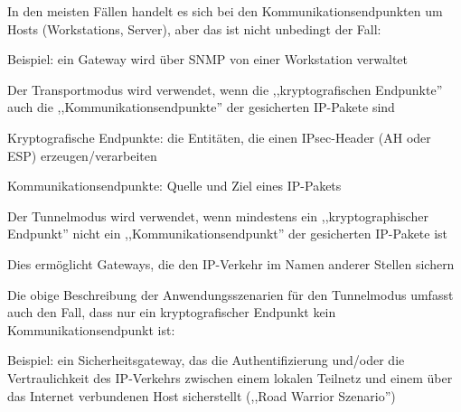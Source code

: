 \documentclass[a4paper]{article}
\begin{document}
\begin{multicols}{3}
      \begin{itemize*}
            \item In den meisten Fällen handelt es sich bei den Kommunikationsendpunkten
            um Hosts (Workstations, Server), aber das ist nicht unbedingt der
            Fall:
            \begin{itemize*}
                  \item Beispiel: ein Gateway wird über SNMP von einer Workstation verwaltet
            \end{itemize*}
            \item Der Transportmodus wird verwendet, wenn die ,,kryptografischen
            Endpunkte'' auch die ,,Kommunikationsendpunkte'' der gesicherten
            IP-Pakete sind
            \begin{itemize*}
                  \item Kryptografische Endpunkte: die Entitäten, die einen IPsec-Header (AH oder ESP) erzeugen/verarbeiten
                  \item Kommunikationsendpunkte: Quelle und Ziel eines IP-Pakets
            \end{itemize*}
            \item Der Tunnelmodus wird verwendet, wenn mindestens ein
            ,,kryptographischer Endpunkt'' nicht ein ,,Kommunikationsendpunkt''
            der gesicherten IP-Pakete ist
            \begin{itemize*}
                  \item Dies ermöglicht Gateways, die den IP-Verkehr im Namen anderer Stellen sichern
            \end{itemize*}
            \item Die obige Beschreibung der Anwendungsszenarien für den Tunnelmodus
            umfasst auch den Fall, dass nur ein kryptografischer Endpunkt kein
            Kommunikationsendpunkt ist:
            \begin{itemize*}
                  \item Beispiel: ein Sicherheitsgateway, das die Authentifizierung und/oder die Vertraulichkeit des IP-Verkehrs zwischen einem lokalen Teilnetz und einem über das Internet verbundenen Host sicherstellt (,,Road Warrior Szenario'')
            \end{itemize*}
      \end{itemize*}



\end{multicols}
\end{document}
